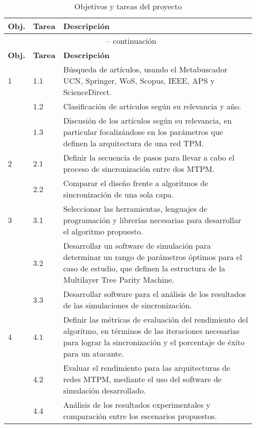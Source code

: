 \begin{longtable}{@{}p{1cm}p{1.5cm}p{12cm}@{}}
  \caption{Objetivos y tareas del proyecto} \label{tabla:objetivos-tareas} \\
  \toprule
  \textbf{Obj.} & \textbf{Tarea} & \textbf{Descripción} \\
  \midrule
  \endfirsthead

  \multicolumn{3}{c}{\tablename\ \thetable{} -- continuación} \\
  \toprule
  \textbf{Obj.} & \textbf{Tarea} & \textbf{Descripción} \\
  \midrule
  \endhead

  \bottomrule
  \endfoot

  1 & 1.1 & Búsqueda de artículos, usando el Metabuscador UCN, Springer, WoS, Scopus, IEEE, APS y ScienceDirect. \\
    & 1.2 & Clasificación de artículos según su relevancia y año. \\
    & 1.3 & Discusión de los artículos según su relevancia, en particular focalizándose en los parámetros que definen la arquitectura de una red TPM. \\

  2 & 2.1 & Definir la secuencia de pasos para llevar a cabo el proceso de sincronización entre dos MTPM. \\
    & 2.2 & Comparar el diseño frente a algoritmos de sincronización de una sola capa. \\

  3 & 3.1 & Seleccionar las herramientas, lenguajes de programación y librerías necesarias para desarrollar el algoritmo propuesto. \\
    & 3.2 & Desarrollar un software de simulación para determinar un rango de parámetros óptimos para el caso de estudio, que definen la estructura de la Multilayer Tree Parity Machine. \\
    & 3.3 & Desarrollar software para el análisis de los resultados de las simulaciones de sincronización. \\

  4 & 4.1 & Definir las métricas de evaluación del rendimiento del algoritmo, en términos de las iteraciones necesarias para lograr la sincronización y el porcentaje de éxito para un atacante. \\
    & 4.2 & Evaluar el rendimiento para las arquitecturas de redes MTPM, mediante el uso del software de simulación desarrollado. \\
    & 4.4 & Análisis de los resultados experimentales y comparación entre los escenarios propuestos. \\

\end{longtable}

